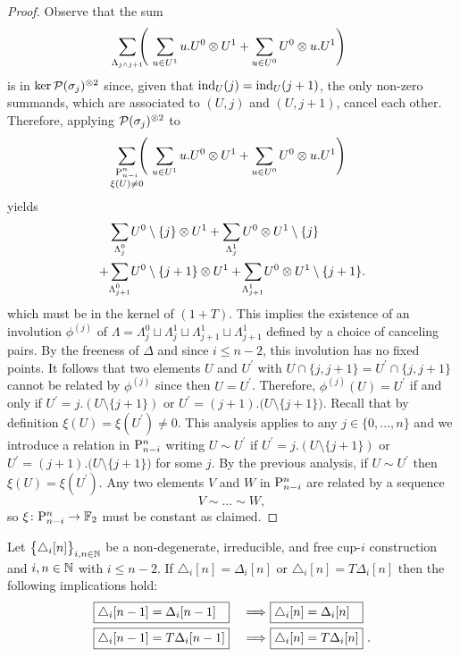 \begin{proof}
	Observe that the sum
	\[
	\sum_{\mathclap{\Lambda_{j \wedge j+1}}}
	\left(\
	\sum_{u \in U^1} u.U^0 \ot U^1 +
	\sum_{u \in U^0} U^0 \ot u.U^1
	\right)
	\]
	is in $\ker \cP(\sigma_j)^{\ot 2}$ since, given that $\ind_U(j) = \ind_U(j+1)$, the only non-zero summands, which are associated to $(U,j)$ and $(U,j+1)$, cancel each other.
	Therefore, applying $\cP(\sigma_j)^{\ot 2}$ to
	\[
	\sum_{\mathclap{\substack{\P_{n-i}^n \\ \xi(U) \neq 0}}}
	\left(\
	\sum_{u \in U^1} {u.U^0} \ot U^1 +
	\sum_{u \in U^0} {U^0} \ot u.U^1
	\right)
	\]
	yields
	\begin{align*}
	&\sum_{\mathclap{\Lambda_{j}^0}} U^0 \setminus \{j\} \ot U^1	+
	\sum_{\mathclap{\Lambda_{j}^1}} U^0 \ot U^1 \setminus \{j\} \\ +
	&\sum_{\mathclap{\Lambda_{j+1}^0}} U^0 \setminus \{j+1\} \ot U^1 +
	\sum_{\mathclap{\Lambda_{j+1}^1}} U^0 \ot {U^1} \setminus \{j+1\}.
	\end{align*}
	which must be in the kernel of $(1+T)$.
	This implies the existence of an involution $\phi^{(j)}$ of $\Lambda = \Lambda^0_{j} \sqcup \Lambda^1_{j} \sqcup \Lambda^1_{j+1} \sqcup \Lambda^1_{j+1}$ defined by a choice of canceling pairs.
	By the freeness of $\Delta$ and since $i \leq n-2$, this involution has no fixed points.
	It follows that two elements $U$ and $U^\prime$ with $U \cap \{j, j+1\} = U^\prime \cap \{j, j+1\}$ cannot be related by $\phi^{(j)}$ since then $U = U^\prime$.
	Therefore, $\phi^{(j)}(U) = U^\prime$ if and only if $U^\prime = j.(U \setminus \{j+1\})$ or $U^\prime = (j+1).\big( U \setminus \{j+1\} \big)$.
	Recall that by definition $\xi(U) = \xi(U^\prime) \neq 0$.
	This analysis applies to any $j \in \{0, \dots, n\}$ and we introduce a relation in $\P_{n-i}^n$ writing $U \sim U^\prime$ if $U^\prime = j.(U \setminus \{j+1\})$ or $U^\prime = (j+1).\big( U \setminus \{j+1\} \big)$ for some $j$.
	By the previous analysis, if $U \sim U^\prime$ then $\xi(U) = \xi(U^\prime)$.
	Any two elements $V$ and $W$ in $\P_{n-i}^n$ are related by a sequence
	\[
	V \sim \dots \sim W,
	\]
	so $\xi \colon \P_{n-i}^n \to \F$ must be constant as claimed.
\end{proof}

\begin{lemma}\label{l:second nail}
	Let $\big\{ \triangle_i [n] \big\}_{i,n\in\N}$ be a non-degenerate, irreducible, and free \mbox{cup-$i$} construction and $i,n \in \N$ with $i \leq n-2$.
	If $\triangle_i [n] = \Delta_i [n]$ or $\triangle_i [n] = T \Delta_i [n]$ then the following implications hold:
	\begin{alignat*}{2}
	&\boxed{\triangle_i [n-1] = \Delta_i [n-1] \kern 7.3pt}\ &\Longrightarrow\
	&\boxed{\triangle_i [n] = \Delta_i [n] \kern 7.3pt} \\
	&\boxed{\triangle_i [n-1] = T \Delta_i [n-1]}\ &\Longrightarrow\
	&\boxed{\triangle_i [n] = T \Delta_i [n]} \ .
	\end{alignat*}
\end{lemma}

